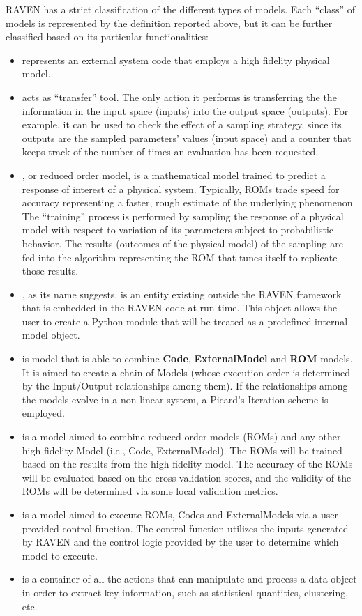 RAVEN has a strict classification of the different types of models.
%
Each ``class'' of models is represented by the definition reported above, but it
can be further classified based on its particular functionalities:
\begin{itemize}
  \item {} represents an external system code that employs a high
  fidelity physical model.
  \item {} acts as ``transfer'' tool.
  The only action it performs is transferring the the information in the input
  space (inputs) into the output space (outputs).
  For example, it can be used to check the effect of a sampling strategy, since
  its outputs are the sampled parameters' values (input space) and a counter
  that keeps track of the number of times an evaluation has been requested.
  \item {}, or reduced order model, is a mathematical model trained
  to predict a response of interest of a physical system.
  Typically, ROMs trade speed for accuracy representing a faster, rough estimate
  of the underlying phenomenon.
  The ``training'' process is performed by sampling the response of a physical
  model with respect to variation of its parameters subject to probabilistic
  behavior.
  The results (outcomes of the physical model) of the sampling are fed into
  the algorithm representing the ROM that tunes itself to replicate those
  results.
  \item {}, as its name suggests, is an entity existing
  outside the RAVEN framework that is embedded in the RAVEN code at run time.
  This object allows the user to create a Python module that will be treated as
  a predefined internal model object.
  \item {} is model that is able to combine \textbf{Code},
  \textbf{ExternalModel} and \textbf{ROM} models. It is aimed to create a chain
  of Models (whose execution order is determined by the Input/Output relationships among them).
  If the relationships among the models evolve in a non-linear system, a Picard's Iteration scheme
  is employed.
  \item {} is a model aimed to combine reduced order models (ROMs) and 
  any other high-fidelity Model (i.e., Code, ExternalModel). 
  The ROMs will be trained based on the results from the high-fidelity model. 
  The accuracy of the ROMs will be evaluated based on the cross validation scores, 
  and the validity of the ROMs will be determined via some local validation metrics.
  \item {} is a model aimed to execute ROMs, Codes and ExternalModels via a user 
  provided control function. The control function utilizes the inputs generated by RAVEN and the control logic 
  provided by the user to determine which model to execute.  
  \item {} is a container of all the actions that can
  manipulate and process a data object in order to extract key information,
  such as statistical quantities, clustering, etc.
\end{itemize}
